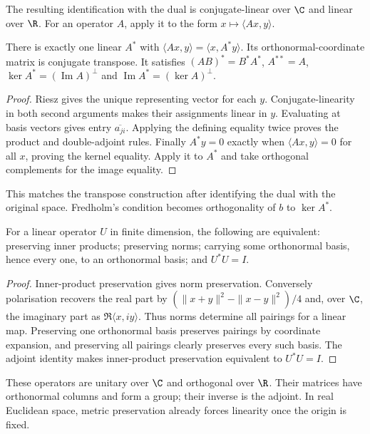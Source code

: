 The resulting identification with the dual is conjugate-linear over $\C$ and linear over $\R$. For an operator $A$, apply it to the form $x\mapsto\langle Ax,y\rangle$.
\begin{proposition}\label{linear:prop:adjoint}
There is exactly one linear $A^*$ with $\langle Ax,y\rangle=\langle x,A^*y\rangle$. Its orthonormal-coordinate matrix is conjugate transpose. It satisfies $(AB)^*=B^*A^*$, $A^{**}=A$, $\ker A^*=(\operatorname{Im}A)^\perp$ and $\operatorname{Im}A^*=(\ker A)^\perp$.
\end{proposition}
\begin{proof}
Riesz gives the unique representing vector for each $y$. Conjugate-linearity in both second arguments makes their assignments linear in $y$. Evaluating at basis vectors gives entry $\overline{a_{ji}}$. Applying the defining equality twice proves the product and double-adjoint rules. Finally $A^*y=0$ exactly when $\langle Ax,y\rangle=0$ for all $x$, proving the kernel equality. Apply it to $A^*$ and take orthogonal complements for the image equality.
\end{proof}

This matches the transpose construction after identifying the dual with the original space. Fredholm's condition becomes orthogonality of $b$ to $\ker A^*$.

\begin{theorem}\label{linear:thm:unitary}
For a linear operator $U$ in finite dimension, the following are equivalent: preserving inner products; preserving norms; carrying some orthonormal basis, hence every one, to an orthonormal basis; and $U^*U=I$.
\end{theorem}
\begin{proof}
Inner-product preservation gives norm preservation. Conversely polarisation recovers the real part by $(\|x+y\|^2-\|x-y\|^2)/4$ and, over $\C$, the imaginary part as $\Re\langle x,iy\rangle$. Thus norms determine all pairings for a linear map. Preserving one orthonormal basis preserves pairings by coordinate expansion, and preserving all pairings clearly preserves every such basis. The adjoint identity makes inner-product preservation equivalent to $U^*U=I$.
\end{proof}

These operators are unitary over $\C$ and orthogonal over $\R$. Their matrices have orthonormal columns and form a group; their inverse is the adjoint. In real Euclidean space, metric preservation already forces linearity once the origin is fixed.

